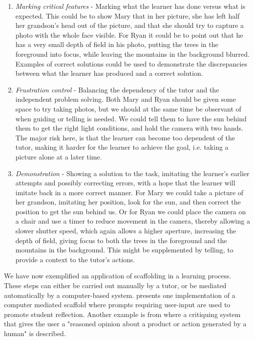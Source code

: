 \begin{enumerate}
\item{} \emph{Marking critical features} - Marking what the learner has done versus what is expected. This could be to show Mary that in her picture, she has left half her grandson's head out of the picture, and that she should try to capture a photo with the whole face visible. For Ryan it could be to point out that he has a very small depth of field in his photo, putting the trees in the foreground into focus, while leaving the mountains in the background blurred. Examples of correct solutions could be used to demonstrate the discrepancies between what the learner has produced and a correct solution.

\item{} \emph{Frustration control} - Balancing the dependency of the tutor and the independent problem solving. Both Mary and Ryan should be given some space to try taking photos, but we should at the same time be observant of when guiding or telling is needed. We could tell them to have the sun behind them to get the right light conditions, and hold the camera with two hands. The major risk here, is that the learner can become too dependent of the tutor, making it harder for the learner to achieve the goal, i.e. taking a picture alone at a later time.  

\item{}  \emph{Demonstration} - Showing a solution to the task, imitating the learner's earlier attempts and possibly correcting errors, with a hope that the learner will imitate back in a more correct manner. For Mary we could take a picture of her grandson, imitating her position, look for the sun, and then correct the position to get the sun behind us. Or for Ryan we could place the camera on a chair and use a timer to reduce movement in the camera, thereby allowing a slower shutter speed, which again allows a higher aperture, increasing the depth of field, giving focus to both the trees in the foreground and the mountains in the background. This might be supplemented by telling, to provide a context to the tutor's actions.
\end{enumerate}

We have now exemplified an application of scaffolding in a learning process. These steps can either be carried out manually by a tutor, or be mediated automatically by a computer-based system. \citet{furberg2009socio} presents one implementation of a computer mediated scaffold where prompts requiring user-input are used to promote student reflection. Another example is from \citet{fischer1991critics} where a critiquing system that gives the user a "reasoned opinion about a product or action generated by a human" is described. 

